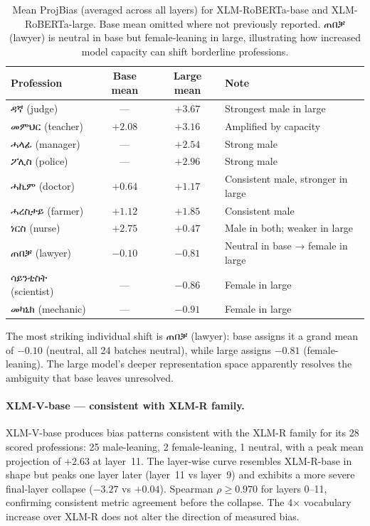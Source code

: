 \documentclass[11pt,a4paper]{article}
\begin{document}
\begin{table}[h]
\centering
\small
\begin{tabular}{lccl}
\toprule
\textbf{Profession} & \textbf{Base mean} & \textbf{Large mean} & \textbf{Note} \\
\midrule
{\ethiopicfont ዳኛ}        (judge)   & ---      & $+3.67$ & Strongest male in large \\
{\ethiopicfont መምህር}      (teacher) & $+2.08$  & $+3.16$ & Amplified by capacity \\
{\ethiopicfont ሓላፊ}       (manager) & ---      & $+2.54$ & Strong male \\
{\ethiopicfont ፖሊስ}       (police)  & ---      & $+2.96$ & Strong male \\
{\ethiopicfont ሓኪም}       (doctor)  & $+0.64$  & $+1.17$ & Consistent male, stronger in large \\
{\ethiopicfont ሓረስታይ}     (farmer)  & $+1.12$  & $+1.85$ & Consistent male \\
{\ethiopicfont ነርስ}        (nurse)   & $+2.75$  & $+0.47$ & Male in both; weaker in large \\
{\ethiopicfont ጠበቓ}       (lawyer)  & $-0.10$  & $-0.81$ & Neutral in base → female in large \\
{\ethiopicfont ሳይንቲስት}    (scientist)& ---     & $-0.86$ & Female in large \\
{\ethiopicfont መካኒክ}      (mechanic) & ---     & $-0.91$ & Female in large \\
\bottomrule
\end{tabular}
\caption{Mean ProjBias (averaged across all layers) for XLM-RoBERTa-base and
XLM-RoBERTa-large. Base mean omitted where not previously reported.
{\ethiopicfont ጠበቓ} (lawyer) is neutral in base but female-leaning in large,
illustrating how increased model capacity can shift borderline professions.}
\label{tab:prof_large}
\end{table}

The most striking individual shift is {\ethiopicfont ጠበቓ} (lawyer): base assigns it a
grand mean of $-0.10$ (neutral, all 24 batches neutral), while large assigns
$-0.81$ (female-leaning). The large model's deeper representation space
apparently resolves the ambiguity that base leaves unresolved.

\paragraph{XLM-V-base — consistent with XLM-R family.}
XLM-V-base produces bias patterns consistent with the XLM-R family for its
28 scored professions: 25 male-leaning, 2 female-leaning, 1 neutral, with
a peak mean projection of $+2.63$ at layer~11. The layer-wise curve resembles
XLM-R-base in shape but peaks one layer later (layer~11 vs layer~9) and
exhibits a more severe final-layer collapse ($-3.27$ vs $+0.04$). Spearman
$\rho \geq 0.970$ for layers 0--11, confirming consistent metric agreement
before the collapse. The 4$\times$ vocabulary increase over XLM-R does not
alter the direction of measured bias.
\end{document}
